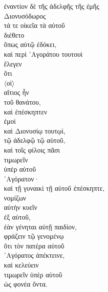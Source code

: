 
{\large
\noindent ἐναντίον δὲ τῆς ἀδελφῆς τῆς ἐμῆς \\
Διονυσόδωρος \\
τά τε οἰκεῖα τὰ αὑτοῦ \\
διέθετο \\
\tabto{2em} ὅπως αὐτῷ ἐδόκει, \\
καὶ περὶ ᾿Αγοράτου τουτουὶ \\
ἔλεγεν \\
\tabto{2em} ὅτι \\
\tabto{4em} $\langle$οἱ$\rangle$ \\
\tabto{4em} αἴτιος ἦν \\
\tabto{6em} τοῦ θανάτου, \\
καὶ ἐπέσκηπτεν \\
\tabto{2em} ἐμοὶ \\
\tabto{2em} καὶ Διονυσίῳ τουτῳί, \\
\tabto{4em} τῷ ἀδελφῷ τῷ αὑτοῦ, \\
\tabto{2em} καὶ τοῖς φίλοις πᾶσι \\
τιμωρεῖν \\
\tabto{2em} ὑπὲρ αὑτοῦ \\
᾿Αγόρατον· \\
καὶ τῇ γυναικὶ τῇ αὑτοῦ ἐπέσκηπτε, \\
νομίζων \\
\tabto{2em} αὐτὴν κυεῖν \\
\tabto{4em} ἐξ αὑτοῦ, \\
ἐὰν γένηται αὐτῇ παιδίον, \\
\tabto{2em} φράζειν τῷ γενομένῳ \\
\tabto{4em} ὅτι τὸν πατέρα αὐτοῦ \\
\tabto{4em} ᾿Αγόρατος ἀπέκτεινε, \\
\tabto{2em} καὶ κελεύειν \\
\tabto{4em} τιμωρεῖν ὑπὲρ αὑτοῦ \\
\tabto{6em} ὡς φονέα ὄντα.\\

}

